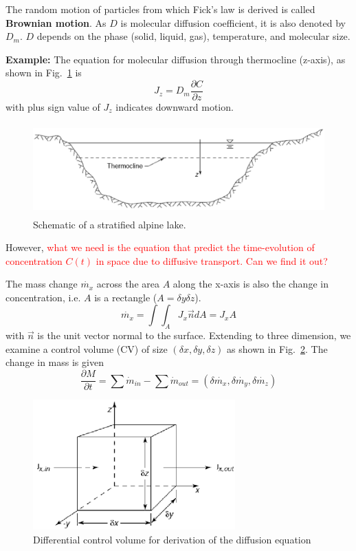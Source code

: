 The random motion of particles from which Fick's law is derived is
called {\bf Brownian motion}. As $D$ is molecular diffusion
coefficient, it is also denoted by $D_m$. $D$ depends on the phase
(solid, liquid, gas), temperature, and molecular size. 

{\bf Example:} The equation for molecular diffusion through
thermocline (z-axis), as shown in Fig.~\ref{fig:alpine-lake} is
\begin{equation}
  \label{eq:185}
  J_z = D_m \frac{\partial C}{\partial z}
\end{equation}
with plus sign value of $J_z$ indicates downward motion.
\begin{figure}[hbt]
 \centerline{\includegraphics[height=3.5cm]{./images/alpine_lake.eps}}
\caption{Schematic of a stratified alpine lake.}
\label{fig:alpine-lake}
\end{figure}


However,
\textcolor{red}{what we need is the equation that predict the
  time-evolution of concentration $C(t)$ in space due to diffusive
  transport. Can we find it out? }

The mass change $\dot{m_x}$ across the area $A$ along the x-axis is
also the change in concentration, i.e. $A$ is a rectangle ($A=\delta
y\delta z$).
\begin{equation}
  \label{eq:176}
  \dot{m_x} = \int\int_A J_x\vec{n}dA = J_xA
\end{equation}
with $\vec{n}$ is the unit vector normal to the surface.  Extending to
three dimension, we examine a control volume (CV) of size $(\delta x,
\delta y, \delta z)$ as shown in Fig.~\ref{fig:diff-volume}. The
change in mass is given
\begin{equation}
  \label{eq:177}
  \frac{\partial M}{\partial t} = \sum \dot{m}_{in} - \sum
  \dot{m}_{out} = (\delta \dot{m_x}, \delta \dot{m_y}, \delta \dot{m_z})
\end{equation}

\begin{figure}[hbt]
 \centerline{\includegraphics[height=5cm]{./images/diff-volume.eps}}
\caption{Differential control volume for derivation of the diffusion equation}
\label{fig:diff-volume}
\end{figure}

